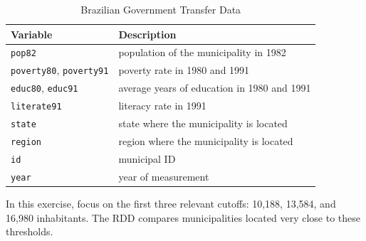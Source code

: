 \documentclass[12pt]{article}
\begin{document}
\begin{table}[H]
\centering
\caption{Brazilian Government Transfer Data}
\label{table:transfer_data_optional}
\begin{tabular}{ll}
\toprule
\textbf{Variable} & \textbf{Description} \\
\midrule
\texttt{pop82} & population of the municipality in 1982 \\
\texttt{poverty80}, \texttt{poverty91} & poverty rate in 1980 and 1991 \\
\texttt{educ80}, \texttt{educ91} & average years of education in 1980 and 1991 \\
\texttt{literate91} & literacy rate in 1991 \\
\texttt{state} & state where the municipality is located \\
\texttt{region} & region where the municipality is located \\
\texttt{id} & municipal ID \\
\texttt{year} & year of measurement \\
\bottomrule
\end{tabular}
\end{table}

In this exercise, focus on the first three relevant cutoffs: 10,188, 13,584, and 16,980 inhabitants. The RDD compares municipalities located very close to these thresholds.
\end{document}
